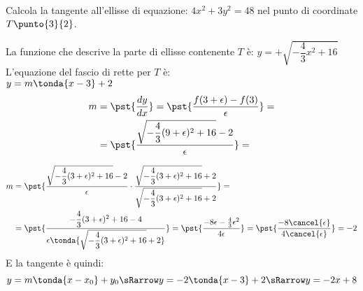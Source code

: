 \begin{esempio}
{~}

\begin{minipage}{.44\textwidth}
Calcola la tangente all'ellisse di equazione:
\(4x^2+3y^2=48\)
nel punto di coordinate \(T\punto{3}{2}\).

La funzione che descrive la parte di ellisse 
contenente \(T\) è:
\(y=+\sqrt{-\dfrac{4}{3}x^2+16}\)\\
L'equazione del fascio di rette per \(T\) è:\\
\(y=m\tonda{x-3}+2\)
\begin{align*}
m&=\pst{\dfrac{d y}{d x}}=
   \pst{\dfrac{f(3+\epsilon)-f(3)}{\epsilon}}=\\
 &=\pst{\dfrac{\sqrt{-\dfrac{4}{3}(9+\epsilon)^2+16}-2}{\epsilon}}=
\end{align*}
\end{minipage}
\hfill
\begin{minipage}{.54\textwidth}
\begin{center}\iperellisse\end{center}
\end{minipage}
\begin{align*}
m&=\pst{\dfrac{\sqrt{-\dfrac{4}{3}(3+\epsilon)^2+16}-2}{\epsilon} \cdot
        \dfrac{\sqrt{-\dfrac{4}{3}(3+\epsilon)^2+16}+2}
              {\sqrt{-\dfrac{4}{3}(3+\epsilon)^2+16}+2}}=\\
 &=\pst{\dfrac{-\dfrac{4}{3}(3+\epsilon)^2+16-4}
              { \epsilon\tonda{\sqrt{-\dfrac{4}{3}(3+\epsilon)^2+16}+2}}}=
   \pst{\dfrac{-8\epsilon-\frac{4}{3}\epsilon^2}{4 \epsilon}}=
   \pst{\dfrac{-8 \cancel{\epsilon}}{4 \cancel{\epsilon}}}=-2
\end{align*}
E la tangente è quindi:
\[y=m \tonda{x-x_0}+y_0 \sRarrow y=-2 \tonda{x-3}+2 \sRarrow y=-2x+8\]

\end{esempio}

